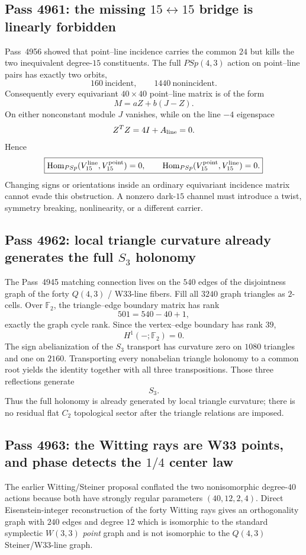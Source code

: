 \subsection{Pass 4961: the missing $15\leftrightarrow15$ bridge is linearly forbidden}
Pass~4956 showed that point--line incidence carries the common $24$ but kills
the two inequivalent degree-$15$ constituents.  The full $PSp(4,3)$ action on
point--line pairs has exactly two orbits,
\[
160\ \text{incident},\qquad1440\ \text{nonincident}.
\]
Consequently every equivariant $40\times40$ point--line matrix is of the form
\[
M=aZ+b(J-Z).
\]
On either nonconstant module $J$ vanishes, while on the line $-4$ eigenspace
\[
Z^TZ=4I+A_{\rm line}=0.
\]
Hence
\[
\boxed{
\operatorname{Hom}_{PSp}(V_{15}^{\rm line},V_{15}^{\rm point})=0,
\qquad
\operatorname{Hom}_{PSp}(V_{15}^{\rm point},V_{15}^{\rm line})=0.}
\]
Changing signs or orientations inside an ordinary equivariant incidence matrix
cannot evade this obstruction.  A nonzero dark-$15$ channel must introduce a
twist, symmetry breaking, nonlinearity, or a different carrier.

\subsection{Pass 4962: local triangle curvature already generates the full $S_3$ holonomy}
The Pass~4945 matching connection lives on the $540$ edges of the disjointness
graph of the forty $Q(4,3)$ / W33-line fibers.  Fill all $3240$ graph triangles
as $2$-cells.  Over $\mathbb F_2$, the triangle--edge boundary matrix has rank
\[
501=540-40+1,
\]
exactly the graph cycle rank.  Since the vertex--edge boundary has rank $39$,
\[
\boxed{H^1(-;\mathbb F_2)=0.}
\]
The sign abelianization of the $S_3$ transport has curvature zero on $1080$
triangles and one on $2160$.  Transporting every nonabelian triangle holonomy
to a common root yields the identity together with all three transpositions.
Those three reflections generate
\[
\boxed{S_3}.
\]
Thus the full holonomy is already generated by local triangle curvature; there
is no residual flat $C_2$ topological sector after the triangle relations are
imposed.

\subsection{Pass 4963: the Witting rays are W33 points, and phase detects the $1/4$ center law}
The earlier Witting/Steiner proposal conflated the two nonisomorphic degree-$40$
actions because both have strongly regular parameters $(40,12,2,4)$.  Direct
Eisenstein-integer reconstruction of the forty Witting rays gives an
orthogonality graph with $240$ edges and degree $12$ which is isomorphic to the
standard symplectic $W(3,3)$ \emph{point} graph and is not isomorphic to the
$Q(4,3)$ Steiner/W33-line graph.


